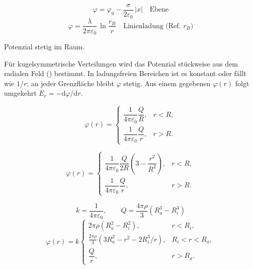 \begin{formulabox}
\[ \varphi = \varphi_0 - \frac{\sigma}{2\varepsilon_0}\,|x| \quad \text{Ebene} \]
\formulasep
\[ \varphi = \frac{\lambda}{2\pi\varepsilon_0}\,\ln\frac{r_B}{r} \quad \text{Linienladung (Ref.\ $r_B$)} \]
\end{formulabox}
\begin{runintext}
Potenzial stetig im Raum.
\end{runintext}

\begin{runintext}
Für kugelsymmetrische Verteilungen wird das Potenzial stückweise aus dem radialen Feld () bestimmt. In ladungsfreien Bereichen ist es konstant oder fällt wie $1/r$; an jeder Grenzfläche bleibt $\varphi$ stetig. Aus einem gegebenen $\varphi(r)$ folgt umgekehrt $E_r=-\mathrm{d}\varphi/\mathrm{d}r$.
\end{runintext}

\begin{formulabox}
\[
\varphi(r)=\begin{cases}
\dfrac{1}{4\pi\varepsilon_0}\dfrac{Q}{R}, & r<R,\\[1ex]
\dfrac{1}{4\pi\varepsilon_0}\dfrac{Q}{r}, & r>R.
\end{cases}
\]
\end{formulabox}

\begin{formulabox}
\[
\varphi(r)=\begin{cases}
\dfrac{1}{4\pi\varepsilon_0}\dfrac{Q}{2R}\left(3-\dfrac{r^2}{R^2}\right), & r<R,\\[2ex]
\dfrac{1}{4\pi\varepsilon_0}\dfrac{Q}{r}, & r>R.
\end{cases}
\]
\end{formulabox}

\begin{formulabox}
\[
k=\frac{1}{4\pi\varepsilon_0},\qquad
Q=\frac{4\pi\rho}{3}\left(R_a^3-R_i^3\right)
\]
\[
\varphi(r)=k\begin{cases}
2\pi\rho\left(R_a^2-R_i^2\right), & r<R_i,\\[1ex]
\tfrac{2\pi\rho}{3}(3R_a^2-r^2-2R_i^3/r), & R_i<r<R_a,\\[2ex]
\dfrac{Q}{r}, & r>R_a.
\end{cases}
\]
\end{formulabox}

